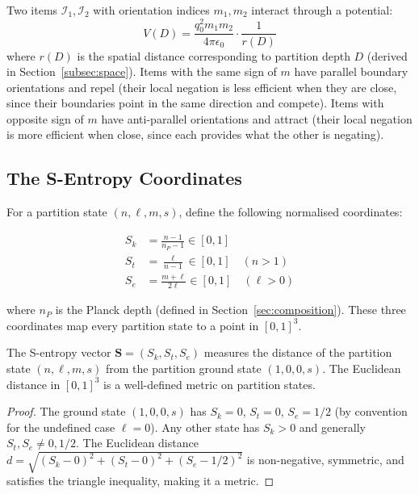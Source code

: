 \begin{theorem}
\label{thm:em_from_partition}
Two items $\mathcal{I}_1, \mathcal{I}_2$ with orientation indices $m_1, m_2$
interact through a potential:
\begin{equation}
    V(D) = \frac{q_0^2 m_1 m_2}{4\pi\epsilon_0} \cdot \frac{1}{r(D)}
    \label{eq:em_potential}
\end{equation}
where $r(D)$ is the spatial distance corresponding to partition depth $D$
(derived in Section~\ref{subsec:space}). Items with the same sign of $m$ have
parallel boundary orientations and repel (their local negation is less efficient
when they are close, since their boundaries point in the same direction and
compete). Items with opposite sign of $m$ have anti-parallel orientations and
attract (their local negation is more efficient when close, since each provides
what the other is negating).
\end{theorem}

\subsection{The S-Entropy Coordinates}
\label{subsec:sentropy}

For a partition state $(n,\ell,m,s)$, define the following normalised coordinates:

\begin{align}
    S_k &= \frac{n-1}{n_P - 1} \in [0,1]
    \label{eq:sk} \\
    S_t &= \frac{\ell}{n-1} \in [0,1] \quad (n > 1)
    \label{eq:st} \\
    S_e &= \frac{m + \ell}{2\ell} \in [0,1] \quad (\ell > 0)
    \label{eq:se}
\end{align}

where $n_P$ is the Planck depth (defined in Section~\ref{sec:composition}).
These three coordinates map every partition state to a point in $[0,1]^3$.

\begin{theorem}
\label{thm:sentropy}
The S-entropy vector $\mathbf{S} = (S_k, S_t, S_e)$ measures the distance of
the partition state $(n,\ell,m,s)$ from the partition ground state $(1,0,0,s)$.
The Euclidean distance in $[0,1]^3$ is a well-defined metric on partition states.
\end{theorem}

\begin{proof}
The ground state $(1,0,0,s)$ has $S_k = 0$, $S_t = 0$, $S_e = 1/2$ (by
convention for the undefined case $\ell = 0$). Any other state has $S_k > 0$
and generally $S_t, S_e \neq 0, 1/2$. The Euclidean distance
$d = \sqrt{(S_k - 0)^2 + (S_t - 0)^2 + (S_e - 1/2)^2}$ is non-negative,
symmetric, and satisfies the triangle inequality, making it a metric.
\end{proof}


